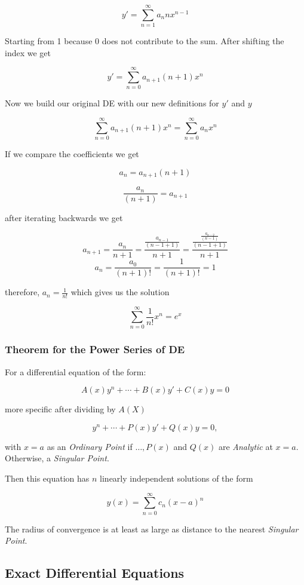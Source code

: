 \[
    y' = \sum_{n = 1}^{\infty} a_n n x^{n - 1}
\]

Starting from 1 because 0 does not contribute to the sum. After shifting the index we get

\[
    y' = \sum_{n = 0}^{\infty} a_{n + 1}(n + 1)x^{n}
\]

Now we build our original DE with our new definitions for \(y'\) and \(y\)

\[
    \sum_{n = 0}^{\infty} a_{n + 1}(n + 1)x^{n} = \sum_{n = 0}^{\infty} a_n x^n
\]

If we compare the coefficients we get

\[
    a_n = a_{n+1}(n+1)
\]

\[
    \frac{a_n}{(n + 1)} = a_{n+1}
\]


after iterating backwards we get

\[
    a_{n + 1} = \frac{a_n}{n + 1} = \frac{\frac{a_{n - 1}}{(n - 1 +1)}}{n + 1} = 
    \frac{\frac{\frac{a_{n - 2}}{(n - 1)}}{(n - 1 + 1)}}{n + 1}   
\]
\[
    a_n = \frac{a_0}{(n + 1)!} = \frac{1}{(n + 1)!} = 1
\]

therefore, \(a_n = \frac{1}{n!}\) which gives us the solution

\[
    \sum_{n = 0}^{\infty}\frac{1}{n!}x^n = e^x
\]

\subsubsection{Theorem for the Power Series of DE}

For a differential equation of the form:

\[
    A(x)y^{n} + \cdots + B(x)y' + C(x)y = 0
\]

more specific after dividing by \(A(X)\)

\[
    y^{n} + \cdots + P(x)y' + Q(x)y = 0,
\]

with \(x = a\) as an \emph{Ordinary Point} if \(\dots, P(x)\) and \(Q(x)\) are 
\emph{Analytic} at \(x = a\). Otherwise, a \emph{Singular Point}.
\vspace{\baselineskip}

Then this equation has \(n\) linearly independent solutions of the form

\[
    y(x) = \sum_{n = 0}^{\infty} c_n {(x - a)}^n
\]

The radius of convergence is at least as large as distance to the nearest \emph{Singular Point}.

\subsection{Exact Differential Equations}

